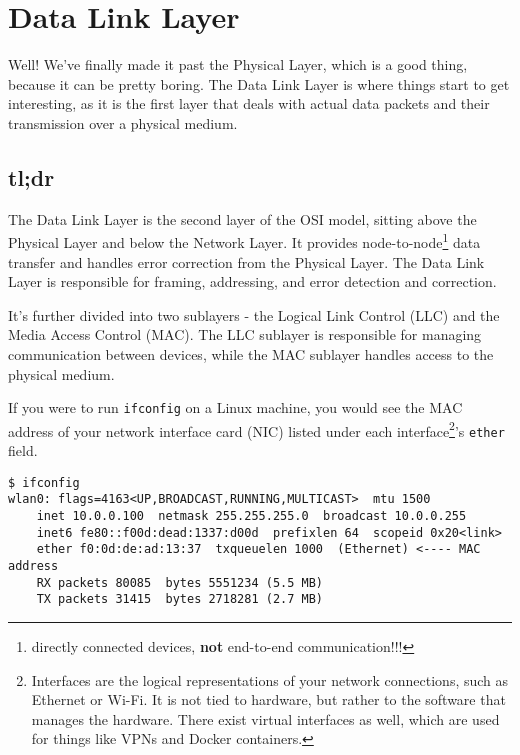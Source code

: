 \chapter{Data Link Layer}\label{sec:datalink_intro}
Well! We've finally made it past the Physical Layer, which is a good thing, because it can be pretty boring. The Data Link Layer is where things start to get interesting, as it is the first layer that deals with actual data packets and their transmission over a physical medium.

\section{tl;dr}
The Data Link Layer is the second layer of the OSI model, sitting above the Physical Layer and below the Network Layer. It provides node-to-node\footnote{
    directly connected devices, \textbf{not} end-to-end communication!!!
} data transfer and handles error correction from the Physical Layer. The Data Link Layer is responsible for framing, addressing, and error detection and correction.

It's further divided into two sublayers - the Logical Link Control (LLC) and the Media Access Control (MAC). The LLC sublayer is responsible for managing communication between devices, while the MAC sublayer handles access to the physical medium. 

If you were to run \texttt{ifconfig} on a Linux machine, you would see the MAC address of your network interface card (NIC) listed under each interface\footnote{
    Interfaces are the logical representations of your network connections, such as Ethernet or Wi-Fi. It is not tied to hardware, but rather to the software that manages the hardware. There exist virtual interfaces as well, which are used for things like VPNs and Docker containers.
}'s \texttt{ether} field.

\begin{verbatim}
$ ifconfig
wlan0: flags=4163<UP,BROADCAST,RUNNING,MULTICAST>  mtu 1500
    inet 10.0.0.100  netmask 255.255.255.0  broadcast 10.0.0.255
    inet6 fe80::f00d:dead:1337:d00d  prefixlen 64  scopeid 0x20<link>
    ether f0:0d:de:ad:13:37  txqueuelen 1000  (Ethernet) <---- MAC address
    RX packets 80085  bytes 5551234 (5.5 MB)
    TX packets 31415  bytes 2718281 (2.7 MB)
\end{verbatim}








